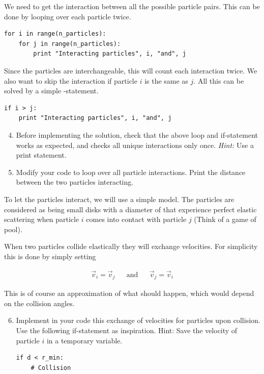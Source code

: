 \documentclass{article}
\begin{document}
We need to get the interaction between all the possible particle pairs.
This can be done by looping over each particle twice.

\begin{lstlisting}
for i in range(n_particles):
    for j in range(n_particles):
        print "Interacting particles", i, "and", j
\end{lstlisting}

Since the particles are interchangeable, this will count each interaction twice.
We also want to skip the interaction if particle $i$ is the same as $j$.
All this can be solved by a simple -statement.

\begin{lstlisting}
if i > j:
    print "Interacting particles", i, "and", j

\end{lstlisting}

\begin{enumerate}
  \setcounter{enumi}{3}
  \item Before implementing the solution, check that the above loop and
      if-statement works as expected, and checks all unique interactions only once. 
      {\em Hint:} Use a print statement.

  \item Modify your code to loop over all particle interactions.
      Print the distance between the two particles interacting.

\end{enumerate}

To let the particles interact, we will use a simple model.
The particles are considered as being small disks with a diameter of  that experience perfect elastic scattering when particle $i$ comes into contact with particle $j$
(Think of a game of pool).

When two particles collide elastically they will exchange velocities.
For simplicity this is done by simply setting

\begin{align}
  \vec{v}_i = \vec{v}_j & & \text{and} & & \vec{v}_j = \vec{v}_i
\end{align}

This is of course an approximation of what should happen, which would depend on the collision angles.

\begin{enumerate}
  \setcounter{enumi}{5}
  \item Implement in your code this exchange of velocities for particles upon collision.
      Use the following if-statement as inspiration.
      {Hint:} Save the velocity of particle $i$ in a temporary variable.

\begin{lstlisting}
if d < r_min:
    # Collision
\end{lstlisting}

\end{enumerate}
\end{document}
